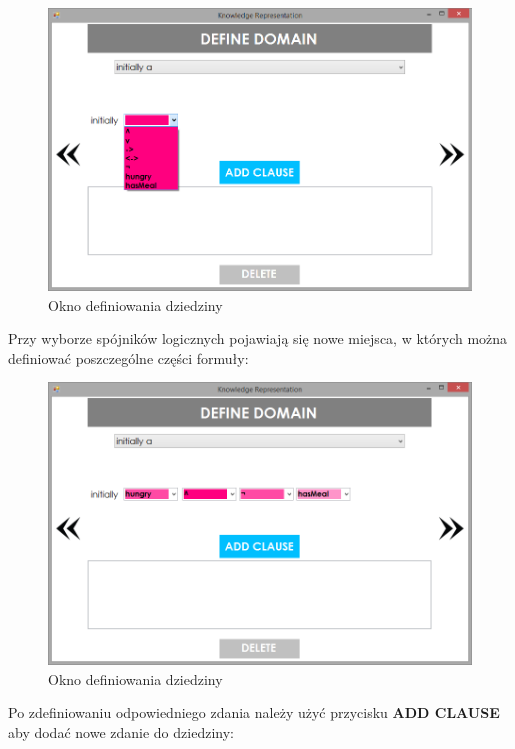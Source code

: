 \documentclass{article}
\begin{document}
\begin{figure}[H]
\centering
\includegraphics[scale=0.4]{06}
\caption{Okno definiowania dziedziny}
\end{figure}


Przy wyborze spójników logicznych pojawiają się nowe miejsca, w których można definiować poszczególne części formuły:

\begin{figure}[H]
\centering
\includegraphics[scale=0.4]{07}
\caption{Okno definiowania dziedziny}
\end{figure}
\newpage

Po zdefiniowaniu odpowiedniego zdania należy użyć przycisku \textbf{ADD CLAUSE} aby dodać nowe zdanie do dziedziny:
 
\end{document}
